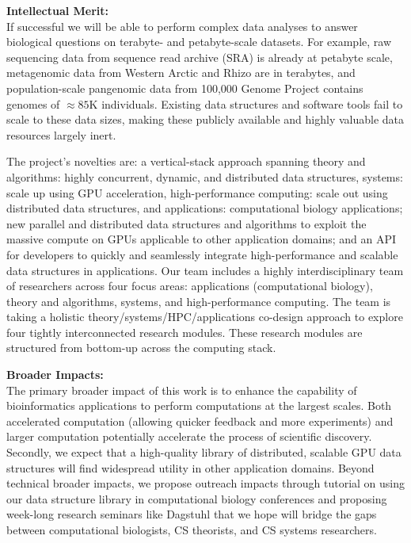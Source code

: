 \noindent \textbf{\large Intellectual Merit:}\\
If successful we will be able to perform complex data analyses to answer biological questions on terabyte- and petabyte-scale datasets. For example, raw sequencing data from sequence read archive (SRA) is already at petabyte scale, metagenomic data from Western Arctic and Rhizo are in terabytes, and population-scale pangenomic data from 100,000 Genome Project contains genomes of $\approx85$K individuals. Existing data structures and software tools fail to scale to these data sizes, making these publicly available and highly valuable data resources largely inert.

The project’s novelties are: a vertical-stack approach spanning theory and algorithms: highly concurrent, dynamic, and distributed data structures, systems: scale up using GPU acceleration, high-performance computing: scale out using distributed data structures, and applications: computational biology applications; new parallel and distributed data structures and algorithms to exploit the massive compute on GPUs applicable to other application domains; and an API for developers to quickly and seamlessly integrate high-performance and scalable data structures in applications.
%
Our team includes a highly interdisciplinary team of researchers across four focus areas: applications (computational biology), theory and algorithms, systems, and high-performance computing. The team is taking a holistic theory/systems/HPC/applications co-design approach to explore four tightly interconnected research modules. These research modules are structured from bottom-up across the computing stack.

\noindent \textbf{\large Broader Impacts: }\\
The primary broader impact of this work is to enhance the capability of bioinformatics applications to perform computations at the largest scales. Both accelerated computation (allowing quicker feedback and more experiments) and larger computation potentially accelerate the process of scientific discovery. Secondly, we expect that a high-quality library of distributed, scalable GPU data structures will find widespread utility in other application domains.
%
Beyond technical broader impacts, we propose outreach impacts through tutorial on using our data structure library in computational biology conferences and proposing week-long research seminars like Dagstuhl that we hope will bridge the gaps between computational biologists, CS theorists, and CS systems researchers.
